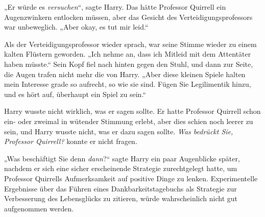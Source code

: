 „Er würde es \emph{versuchen}“, sagte Harry. Das hätte Professor Quirrell ein Augenzwinkern entlocken müssen, aber das Gesicht des Verteidigungsprofessors war unbeweglich. „Aber okay, es tut mir leid.“

Als der Verteidigungsprofessor wieder sprach, war seine Stimme wieder zu einem kalten Flüstern geworden. „Ich nehme an, dass ich Mitleid mit dem Attentäter haben müsste.“ Sein Kopf fiel nach hinten gegen den Stuhl, und dann zur Seite, die Augen trafen nicht mehr die von Harry. „Aber diese kleinen Spiele halten mein Interesse grade so aufrecht, so wie sie sind. Fügen Sie Legilimentik hinzu, und es hört auf, überhaupt ein Spiel zu sein.“

Harry wusste nicht wirklich, was er sagen sollte. Er hatte Professor Quirrell schon ein- oder zweimal in wütender Stimmung erlebt, aber dies schien noch leerer zu sein, und Harry wusste nicht, was er dazu sagen sollte. \emph{Was bedrückt Sie, Professor Quirrell?} konnte er nicht fragen.

„Was beschäftigt Sie denn \emph{dann}?“ sagte Harry ein paar Augenblicke später, nachdem er sich eine sicher erscheinende Strategie zurechtgelegt hatte, um Professor Quirrells Aufmerksamkeit auf positive Dinge zu lenken. Experimentelle Ergebnisse über das Führen eines Dankbarkeitstagebuchs als Strategie zur Verbesserung des Lebensglücks zu zitieren, würde wahrscheinlich nicht gut aufgenommen werden.

